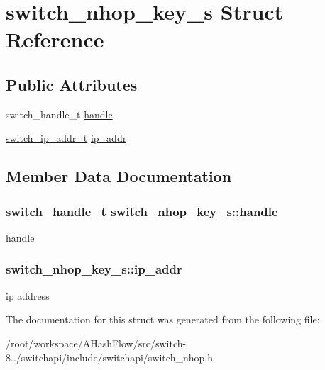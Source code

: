 \hypertarget{structswitch__nhop__key__s}{\section{switch\+\_\+nhop\+\_\+key\+\_\+s Struct Reference}
\label{structswitch__nhop__key__s}
}
\subsection*{Public Attributes}
\begin{DoxyCompactItemize}
\item 
switch\+\_\+handle\+\_\+t \hyperlink{structswitch__nhop__key__s_a44f99af2aa77eb446d7b83086a05209e}{handle}
\item 
\hyperlink{structswitch__ip__addr__s}{switch\+\_\+ip\+\_\+addr\+\_\+t} \hyperlink{structswitch__nhop__key__s_a0202ec9f8a95997d4343b8e266f13480}{ip\+\_\+addr}
\end{DoxyCompactItemize}


\subsection{Member Data Documentation}
\hypertarget{structswitch__nhop__key__s_a44f99af2aa77eb446d7b83086a05209e}{
\subsubsection[{handle}]{\setlength{\rightskip}{0pt plus 5cm}switch\+\_\+handle\+\_\+t switch\+\_\+nhop\+\_\+key\+\_\+s\+::handle}}\label{structswitch__nhop__key__s_a44f99af2aa77eb446d7b83086a05209e}
handle \hypertarget{structswitch__nhop__key__s_a0202ec9f8a95997d4343b8e266f13480}{
\subsubsection[{ip\+\_\+addr}]{ switch\+\_\+nhop\+\_\+key\+\_\+s\+::ip\+\_\+addr}}\label{structswitch__nhop__key__s_a0202ec9f8a95997d4343b8e266f13480}
ip address 

The documentation for this struct was generated from the following file\+:\begin{DoxyCompactItemize}
\item 
/root/workspace/\+A\+Hash\+Flow/src/switch-\/8../switchapi/include/switchapi/switch\+\_\+nhop.\+h\end{DoxyCompactItemize}
